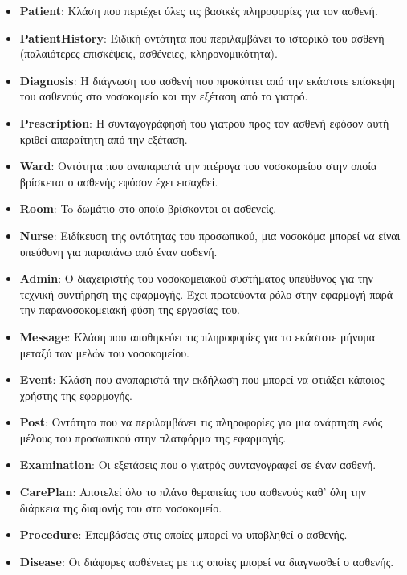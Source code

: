 \documentclass{article}
\begin{document}
\begin{itemize}
    \item \textbf{Patient}: Κλάση που περιέχει όλες τις βασικές πληροφορίες για τον ασθενή.
    \item \textbf{PatientHistory}: Ειδική οντότητα που περιλαμβάνει το ιστορικό του ασθενή (παλαιότερες επισκέψεις, ασθένειες, κληρονομικότητα).
    \item \textbf{Diagnosis}: Η διάγνωση του ασθενή που προκύπτει από την εκάστοτε επίσκεψη του ασθενούς στο νοσοκομείο και την εξέταση από το γιατρό.
    \item \textbf{Prescription}: Η συνταγογράφησή του γιατρού προς τον ασθενή εφόσον αυτή κριθεί απαραίτητη από την εξέταση.
    \item \textbf{Ward}: Οντότητα που αναπαριστά την πτέρυγα του νοσοκομείου στην οποία βρίσκεται ο ασθενής εφόσον έχει εισαχθεί.
    \item \textbf{Room}: To δωμάτιο στο οποίο βρίσκονται οι ασθενείς.
    \item \textbf{Nurse}: Ειδίκευση της οντότητας του προσωπικού, μια νοσοκόμα μπορεί να είναι υπεύθυνη για παραπάνω από έναν ασθενή.
    \item\textbf{Admin}: Ο διαχειριστής του νοσοκομειακού συστήματος υπεύθυνος για την τεχνική συντήρηση της εφαρμογής. Έχει πρωτεύοντα ρόλο στην εφαρμογή παρά την παρανοσοκομειακή φύση της εργασίας του.
    \item\textbf{Message}: Κλάση που αποθηκεύει τις πληροφορίες για το εκάστοτε μήνυμα μεταξύ των μελών του νοσοκομείου.
    \item\textbf{Event}: Κλάση που αναπαριστά την εκδήλωση που μπορεί να φτιάξει κάποιος χρήστης της εφαρμογής.
    \item\textbf{Post}: Οντότητα που να περιλαμβάνει τις πληροφορίες για μια ανάρτηση ενός μέλους του προσωπικού στην πλατφόρμα της εφαρμογής.
    \item\textbf{Examination}: Οι εξετάσεις που ο γιατρός συνταγογραφεί σε έναν ασθενή.
    \item\textbf{CarePlan}: Αποτελεί όλο το πλάνο θεραπείας του ασθενούς καθ' όλη την διάρκεια της διαμονής του στο νοσοκομείο.
    \item\textbf{Procedure}: Επεμβάσεις στις οποίες μπορεί να υποβληθεί ο ασθενής.
    \item\textbf{Disease}: Οι διάφορες ασθένειες με τις οποίες μπορεί να διαγνωσθεί ο ασθενής.
\end{itemize}
\end{document}

